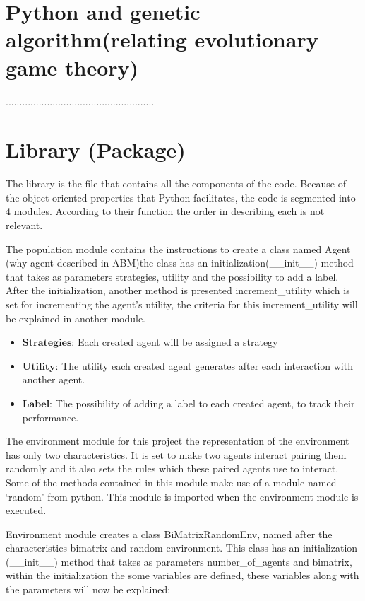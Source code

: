 \documentclass{article}
\begin{document}
\section{Python and genetic algorithm(relating evolutionary game theory)}
......................................................

\section{Library (Package)}\label{library_section}
The library is the file that contains all the components of the code. Because of the object oriented properties that Python facilitates, the code is segmented into 4 modules. According to their function the order in describing each is not relevant.

The population module contains the instructions to create a class named Agent (why agent described in ABM)the class has an initialization(\_\_init\_\_) method that takes as parameters strategies, utility and the possibility to add a label. After the initialization, another method is presented increment\_utility which is set for incrementing the agent’s utility, the criteria for this increment\_utility will be explained in another module.

\begin{itemize}
\item $\textbf{Strategies:}$ Each created agent will be assigned a strategy
\item $\textbf{Utility:}$ The utility each created agent generates after each interaction with another agent.
\item $\textbf{Label:}$ The possibility of adding a label to each created agent, to track their performance.
\end{itemize}

The environment module for this project the representation of the environment has only two characteristics. It is set to make two agents interact pairing them randomly and it also sets the rules which these paired agents use to interact. Some of the methods contained in this module make use of a module named ‘random’ from python. This module is imported when the environment module is executed.

Environment module creates a class BiMatrixRandomEnv, named after the characteristics bimatrix and random environment. This class has an initialization (\_\_init\_\_) method that takes as parameters number\_of\_agents and bimatrix, within the initialization the some variables are defined, these variables along with the parameters will now be explained:
\end{document}
